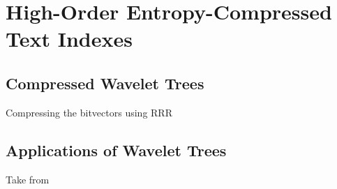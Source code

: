\chapter{High-Order Entropy-Compressed Text Indexes} %
\label{ch:Chapter3}







\section{Compressed Wavelet Trees}
Compressing the bitvectors using RRR

\section{Applications of Wavelet Trees}
Take from \citep{WTForALL,WTFromTheoryToPractice,TheMyriadVirtuesWT}
